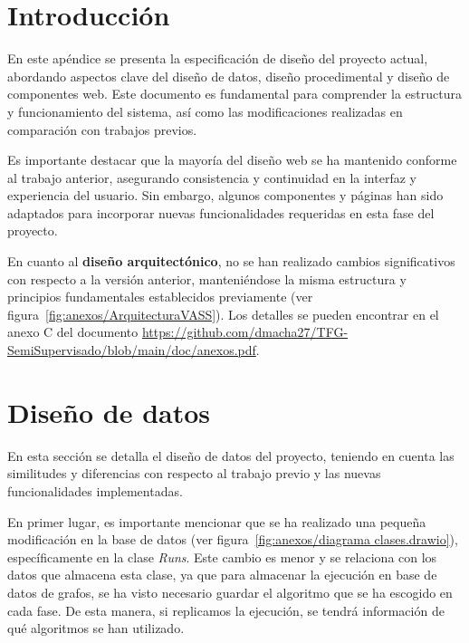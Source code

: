 
\section{Introducción}
En este apéndice se presenta la especificación de diseño del proyecto actual, abordando aspectos clave del diseño de datos, diseño procedimental y diseño de componentes web. Este documento es fundamental para comprender la estructura y funcionamiento del sistema, así como las modificaciones realizadas en comparación con trabajos previos.

Es importante destacar que la mayoría del diseño web se ha mantenido conforme al trabajo anterior, asegurando consistencia y continuidad en la interfaz y experiencia del usuario. Sin embargo, algunos componentes y páginas han sido adaptados para incorporar nuevas funcionalidades requeridas en esta fase del proyecto.

En cuanto al \textbf{diseño arquitectónico}, no se han realizado cambios significativos con respecto a la versión anterior, manteniéndose la misma estructura y principios fundamentales establecidos previamente (ver figura~\ref{fig:anexos/ArquitecturaVASS}). Los detalles se pueden encontrar en el anexo C del documento \url{https://github.com/dmacha27/TFG-SemiSupervisado/blob/main/doc/anexos.pdf}.

\section{Diseño de datos}
En esta sección se detalla el diseño de datos del proyecto, teniendo en cuenta las similitudes y diferencias con respecto al trabajo previo y las nuevas funcionalidades implementadas.

En primer lugar, es importante mencionar que se ha realizado una pequeña modificación en la base de datos (ver figura~\ref{fig:anexos/diagrama clases.drawio}), específicamente en la clase \textit{Runs}. Este cambio es menor y se relaciona con los datos que almacena esta clase, ya que para almacenar la ejecución en base de datos de grafos, se ha visto necesario guardar el algoritmo que se ha escogido en cada fase. De esta manera, si replicamos la ejecución, se tendrá información de qué algoritmos se han utilizado.


